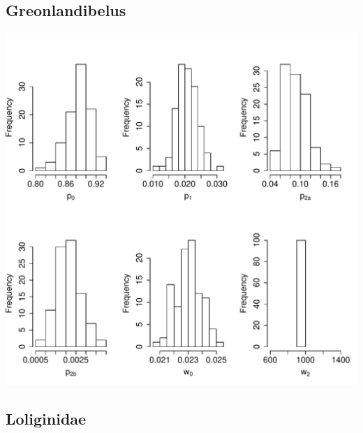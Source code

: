 \documentclass[12pt,letterpaper]{article}\usepackage[]{graphicx}\usepackage[]{color}
\makeatletter
\def\maxwidth{ %
  \ifdim\Gin@nat@width>\linewidth
    \linewidth
  \else
    \Gin@nat@width
  \fi
}
\newenvironment{knitrout}{}{} %
\makeatother
\begin{document}
\subsection*{Greonlandibelus}



\begin{knitrout}
\color{fgcolor}

{\centering \includegraphics[width=\maxwidth]{./figures/Groenlandibelus_plots-1} 

}



\end{knitrout}

\clearpage

\subsection*{Loliginidae}
\end{document}
